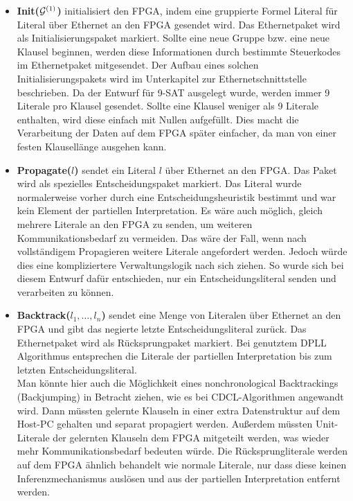 \begin{itemize}
\item
  \textbf{Init(${\cal G}^{(1)}$)} initialisiert den FPGA, indem eine
  gruppierte Formel Literal für Literal über Ethernet an den FPGA gesendet
  wird. Das Ethernetpaket wird als Initialisierungspaket 
  markiert. Sollte eine neue Gruppe bzw. eine neue Klausel beginnen,
  werden diese Informationen durch bestimmte Steuerkodes im
  Ethernetpaket mitgesendet. Der Aufbau eines solchen
  Initialisierungspakets wird im Unterkapitel zur
  Ethernetschnittstelle beschrieben. Da der Entwurf für 9-SAT
  ausgelegt wurde, werden immer 9 Literale pro Klausel gesendet. 
  Sollte eine Klausel weniger als 9 Literale enthalten, wird 
  diese einfach mit Nullen aufgefüllt. Dies macht die Verarbeitung
  der Daten auf dem FPGA später einfacher, da man von einer 
  festen Klausellänge ausgehen kann.
\item
  \textbf{Propagate($l$)} sendet ein Literal $l$ über Ethernet an
 den FPGA. Das Paket wird als spezielles Entscheidungspaket
 markiert. Das Literal wurde normalerweise vorher durch
 eine Entscheidungsheuristik  bestimmt und war kein
 Element der partiellen Interpretation. Es wäre auch
 möglich, gleich mehrere Literale an den FPGA zu senden, 
 um weiteren Kommunikationsbedarf
 zu vermeiden. Das wäre der Fall,
  wenn nach vollständigem Propagieren weitere Literale angefordert
 werden. Jedoch würde dies
  eine kompliziertere Verwaltungslogik nach sich ziehen.
 So wurde sich bei diesem Entwurf dafür
  entschieden, nur ein Entscheidungsliteral senden und
 verarbeiten zu können.
\item
  \textbf{Backtrack(${l_1, …, l_n}$)} sendet eine Menge von Literalen über Ethernet an den FPGA
  und gibt das negierte letzte Entscheidungsliteral zurück. 
  Das Ethernetpaket wird als Rücksprungpaket markiert. Bei genutztem DPLL Algorithmus entsprechen
  die Literale der partiellen Interpretation bis zum letzten Entscheidungsliteral.\\
  Man könnte hier auch die Möglichkeit eines nonchronological Backtrackings (Backjumping) in 
  Betracht ziehen, wie es bei CDCL-Algorithmen angewandt wird. Dann müssten gelernte Klauseln
  in einer extra Datenstruktur auf dem Host-PC gehalten und separat propagiert werden.
  Außerdem müssten Unit-Literale der gelernten Klauseln dem FPGA mitgeteilt werden, was wieder mehr
  Kommunikationsbedarf bedeuten würde. 
  Die Rücksprungliterale werden auf dem FPGA ähnlich behandelt wie normale Literale, nur
  dass diese keinen Inferenzmechanismus auslösen und aus der partiellen Interpretation
  entfernt werden.


\end{itemize}
